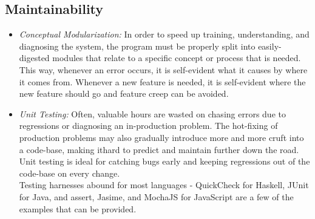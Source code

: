 \documentclass[titlepage, 12pt]{extarticle}
\begin{document}
\subsection{Maintainability}
\begin{itemize}
\item {\it Conceptual Modularization:} In order to speed up training, understanding, and diagnosing the system, the program must be properly split into easily-digested modules that relate to a specific concept or process that is needed. This way, whenever an error occurs, it is self-evident what it causes by where it comes from. Whenever a new feature is needed, it is self-evident where the new feature should go and feature creep can be avoided.
\item {\it Unit Testing:} Often, valuable hours are wasted on chasing errors due to regressions or diagnosing an in-production problem. The hot-fixing of production problems may also gradually introduce more and more cruft into a code-base, making ithard to predict and maintain further down the road. Unit testing is ideal for catching bugs early and keeping regressions out of the code-base on every change.
\\Testing harnesses abound for most languages - QuickCheck for Haskell, JUnit for Java, and assert, Jasime, and MochaJS for JavaScript are a few of the examples that can be provided.
\end{itemize}
\end{document}
